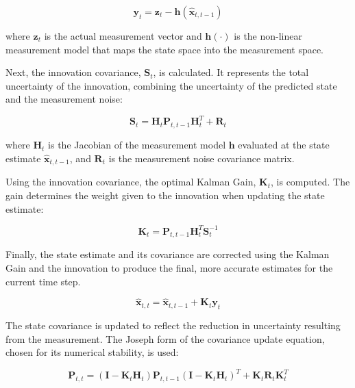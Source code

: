 \begin{equation}
    \mathbf{y}_t = \mathbf{z}_t - \mathbf{h}(\mathbf{\hat{x}}_{t,t-1})
\end{equation}

\noindent
where \(\mathbf{z}_t\) is the actual measurement vector and \(\mathbf{h}(\cdot)\) is the non-linear measurement model that maps the state space into the measurement space.
\vspace{0.5cm}

\noindent
Next, the innovation covariance, $\mathbf{S}_t$, is calculated. It represents the total uncertainty of the innovation, combining the uncertainty of the predicted state 
and the measurement noise:

\begin{equation}
    \mathbf{S}_t = \mathbf{H}_t\mathbf{P}_{t,t-1}\mathbf{H}_t^T + \mathbf{R}_t
\end{equation}

\noindent
where $\mathbf{H}_t$ is the Jacobian of the measurement model $\mathbf{h}$ evaluated at the  state estimate $\mathbf{\hat{x}}_{t,t-1}$, and $\mathbf{R}_t$ 
is the measurement noise covariance matrix.
\vspace{0.5cm}

\noindent
Using the innovation covariance, the optimal Kalman Gain, \(\mathbf{K}_t\), is computed. The gain determines the weight given to the innovation when updating the state estimate:

\begin{equation}
    \mathbf{K}_t = \mathbf{P}_{t,t-1}\mathbf{H}_t^T \mathbf{S}_t^{-1}
\end{equation}

\noindent
Finally, the state estimate and its covariance are corrected using the Kalman Gain and the innovation to produce the final, more accurate estimates for the 
current time step.

\begin{equation}
    \mathbf{\hat{x}}_{t,t} = \mathbf{\hat{x}}_{t,t-1} + \mathbf{K}_t \mathbf{y}_t
\end{equation}

\noindent
The state covariance is updated to reflect the reduction in uncertainty resulting from the measurement. The Joseph form of the covariance update equation, chosen for its
numerical stability, is used:

\begin{equation}
    \mathbf{P}_{t,t} = (\mathbf{I}-\mathbf{K}_t\mathbf{H}_t)\mathbf{P}_{t,t-1}(\mathbf{I}-\mathbf{K}_t\mathbf{H}_t)^T + \mathbf{K}_t\mathbf{R}_t\mathbf{K}_t^T
\end{equation}

